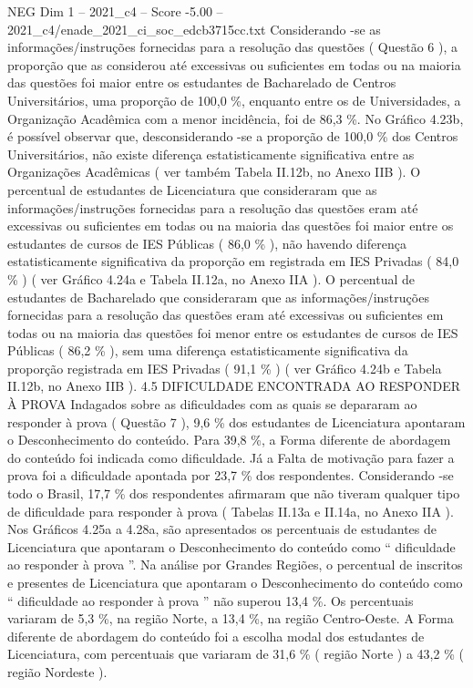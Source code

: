 \begin{textsample}{NEG Dim 1 – 2021\_c4 – Score -5.00 – 2021\_c4/enade\_2021\_ci\_soc\_edcb3715cc.txt}
Considerando -se as informações/instruções fornecidas para a resolução das questões ( Questão 6 ), a proporção que as considerou até excessivas ou suficientes em todas ou na maioria das questões foi maior entre os estudantes de Bacharelado de Centros Universitários, uma proporção de 100,0 \%, enquanto entre os de Universidades, a Organização Acadêmica com a menor incidência, foi de 86,3 \%.
No Gráfico 4.23b, é possível observar que, desconsiderando -se a proporção de 100,0 \% dos Centros Universitários, não existe diferença estatisticamente significativa entre as Organizações Acadêmicas ( ver também Tabela II.12b, no Anexo IIB ).
O percentual de estudantes de Licenciatura que consideraram que as informações/instruções fornecidas para a resolução das questões eram até excessivas ou suficientes em todas ou na maioria das questões foi maior entre os estudantes de cursos de IES Públicas ( 86,0 \% ), não havendo diferença estatisticamente significativa da proporção em registrada em IES Privadas ( 84,0 \% ) ( ver Gráfico 4.24a e Tabela II.12a, no Anexo IIA ).
O percentual de estudantes de Bacharelado que consideraram que as informações/instruções fornecidas para a resolução das questões eram até excessivas ou suficientes em todas ou na maioria das questões foi menor entre os estudantes de cursos de IES Públicas ( 86,2 \% ), sem uma diferença estatisticamente significativa da proporção registrada em IES Privadas ( 91,1 \% ) ( ver Gráfico 4.24b e Tabela II.12b, no Anexo IIB ). 4.5 DIFICULDADE ENCONTRADA AO RESPONDER À PROVA Indagados sobre as dificuldades com as quais se depararam ao responder à prova ( Questão 7 ), 9,6 \% dos estudantes de Licenciatura apontaram o Desconhecimento do conteúdo.
Para 39,8 \%, a Forma diferente de abordagem do conteúdo foi indicada como dificuldade.
Já a Falta de motivação para fazer a prova foi a dificuldade apontada por 23,7 \% dos respondentes.
Considerando -se todo o Brasil, 17,7 \% dos respondentes afirmaram que não tiveram qualquer tipo de dificuldade para responder à prova ( Tabelas II.13a e II.14a, no Anexo IIA ).
Nos Gráficos 4.25a a 4.28a, são apresentados os percentuais de estudantes de Licenciatura que apontaram o Desconhecimento do conteúdo como “ dificuldade ao responder à prova ”.
Na análise por Grandes Regiões, o percentual de inscritos e presentes de Licenciatura que apontaram o Desconhecimento do conteúdo como “ dificuldade ao responder à prova ” não superou 13,4 \%.
Os percentuais variaram de 5,3 \%, na região Norte, a 13,4 \%, na região Centro-Oeste.
A Forma diferente de abordagem do conteúdo foi a escolha modal dos estudantes de Licenciatura, com percentuais que variaram de 31,6 \% ( região Norte ) a 43,2 \% ( região Nordeste ).

\end{textsample}
